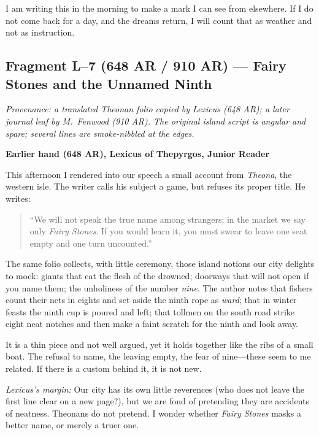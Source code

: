 \documentclass[11pt]{article}
\begin{document}
I am writing this in the morning to make a mark I can see from elsewhere. If I do not come back for a day, and the dreams return, I will count that as weather and not as instruction.

\subsection{Fragment L--7 (648 AR / 910 AR) --- Fairy Stones and the Unnamed Ninth}
\label{frag:l7}
{}

\noindent\textit{Provenance: a translated Theonan folio copied by Lexicus (648 AR); a later journal leaf by M.\ Fenwood (910 AR). The original island script is angular and spare; several lines are smoke-nibbled at the edges.}

\medskip
\noindent\textbf{Earlier hand (648 AR), Lexicus of Thepyrgos, Junior Reader}

This afternoon I rendered into our speech a small account from \textit{Theona}, the western isle. The writer calls his subject a game, but refuses its proper title. He writes:

\begin{quote}\small
``We will not speak the true name among strangers; in the market we say only \emph{Fairy Stones}. If you would learn it, you must swear to leave one seat empty and one turn uncounted.'' 
\end{quote}

The same folio collects, with little ceremony, those island notions our city delights to mock: giants that eat the flesh of the drowned; doorways that will not open if you name them; the unholiness of the number \textit{nine}. The author notes that fishers count their nets in eights and set aside the ninth rope as \emph{ward}; that in winter feasts the ninth cup is poured and left; that tollmen on the south road strike eight neat notches and then make a faint scratch for the ninth and look away.

It is a thin piece and not well argued, yet it holds together like the ribs of a small boat. The refusal to name, the leaving empty, the fear of nine---these seem to me related. If there is a custom behind it, it is not new.

\medskip
\noindent\textit{Lexicus’s margin:} Our city has its own little reverences (who does not leave the first line clear on a new page?), but we are fond of pretending they are accidents of neatness. Theonans do not pretend. I wonder whether \emph{Fairy Stones} masks a better name, or merely a truer one.
\end{document}
